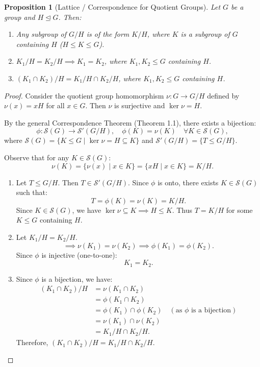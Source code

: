 \documentclass[12pt]{article}
\theoremstyle{definition}
\theoremstyle{plain}
\newtheorem{proposition}[theorem]{Proposition}
\begin{document}
\begin{proposition}[Lattice / Correspondence for Quotient Groups]
Let $G$ be a group and $H \trianglelefteq G$. Then:
\begin{enumerate}
    \item Any subgroup of $G/H$ is of the form $K/H$, where $K$ is a subgroup of $G$ containing $H$ ($H \le K \le G$).
    \item $K_1/H = K_2/H \implies K_1 = K_2$, where $K_1, K_2 \le G$ containing $H$.
    \item $(K_1 \cap K_2)/H = K_1/H \cap K_2/H$, where $K_1, K_2 \le G$ containing $H$.
\end{enumerate}
\end{proposition}

\begin{proof}
Consider the quotient group homomorphism $\nu: G \to G/H$ defined by $\nu(x) = xH$ for all $x \in G$.
Then $\nu$ is surjective and $\ker \nu = H$.

By the general Correspondence Theorem (Theorem 1.1), there exists a bijection:
\[
\phi: \mathcal{S}(G) \to \mathcal{S}'(G/H), \quad \phi(K) = \nu(K) \quad \forall K \in \mathcal{S}(G),
\]
where $\mathcal{S}(G) = \{ K \le G \mid \ker \nu = H \subseteq K \}$ and $\mathcal{S}'(G/H) = \{ T \le G/H \}$.

Observe that for any $K \in \mathcal{S}(G)$:
\[
\nu(K) = \{ \nu(x) \mid x \in K \} = \{ xH \mid x \in K \} = K/H.
\]
\begin{enumerate}
    \item Let $T \le G/H$. Then $T \in \mathcal{S}'(G/H)$.
    Since $\phi$ is onto, there exists $K \in \mathcal{S}(G)$ such that:
    \[
    T = \phi(K) = \nu(K) = K/H.
    \]
    Since $K \in \mathcal{S}(G)$, we have $\ker \nu \subseteq K \implies H \le K$.
    Thus $T = K/H$ for some $K \le G$ containing $H$.
    
    \item Let $K_1/H = K_2/H$.
    \[
    \implies \nu(K_1) = \nu(K_2) \implies \phi(K_1) = \phi(K_2).
    \]
    Since $\phi$ is injective (one-to-one):
    \[
    K_1 = K_2.
    \]
    
    \item Since $\phi$ is a bijection, we have:
    \begin{align*}
    (K_1 \cap K_2)/H &= \nu(K_1 \cap K_2) \\
    &= \phi(K_1 \cap K_2) \\
    &= \phi(K_1) \cap \phi(K_2) \quad (\text{as } \phi \text{ is a bijection}) \\
    &= \nu(K_1) \cap \nu(K_2) \\
    &= K_1/H \cap K_2/H.
    \end{align*}
    Therefore, $\boxed{(K_1 \cap K_2)/H = K_1/H \cap K_2/H}$. \qedhere
\end{enumerate}
\end{proof}
\end{document}
